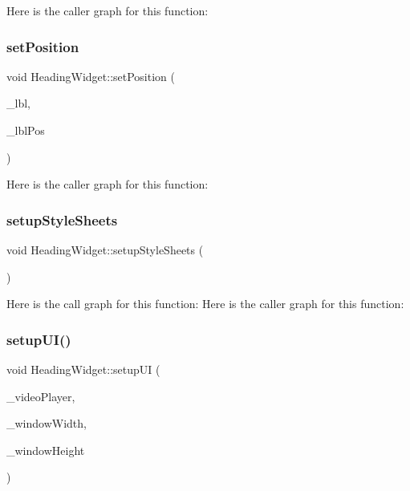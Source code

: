 Here is the caller graph for this function\+:
\mbox{\label{class_heading_widget_af5b9fd1a9b6268a73a486529e92ca9b1}} 
\subsubsection{\texorpdfstring{set\+Position}{setPosition}}
{\footnotesize\ttfamily void Heading\+Widget\+::set\+Position (\begin{DoxyParamCaption}\item[{Q\+Label $\ast$}]{\+\_\+lbl,  }\item[{\mbox{\hyperlink{class_position}{Position}} $\ast$}]{\+\_\+lbl\+Pos }\end{DoxyParamCaption})\hspace{0.3cm}{\ttfamily [slot]}}

Here is the caller graph for this function\+:
\mbox{\label{class_heading_widget_a23d83c2a9906e54385bf67d6a4df1bb0}} 
\subsubsection{\texorpdfstring{setup\+Style\+Sheets}{setupStyleSheets}}
{\footnotesize\ttfamily void Heading\+Widget\+::setup\+Style\+Sheets (\begin{DoxyParamCaption}{ }\end{DoxyParamCaption})\hspace{0.3cm}{\ttfamily [slot]}}

Here is the call graph for this function\+:
Here is the caller graph for this function\+:
\mbox{\label{class_heading_widget_ab65afa6442eda14ec2f7cf56ae962404}} 
\subsubsection{\texorpdfstring{setup\+U\+I()}{setupUI()}}
{\footnotesize\ttfamily void Heading\+Widget\+::setup\+UI (\begin{DoxyParamCaption}\item[{Q\+Widget $\ast$}]{\+\_\+video\+Player,  }\item[{int $\ast$}]{\+\_\+window\+Width,  }\item[{int $\ast$}]{\+\_\+window\+Height }\end{DoxyParamCaption})}

